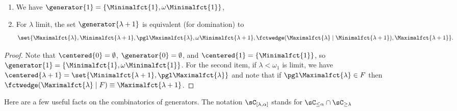 \begin{fact}\label{AlreadyKnownGenerators}
\begin{enumerate}
\item We have $\generator{1}=\{\Minimalfct{1}, \omega \Minimalfct{1}\}$,
\item For $\lambda$ limit, the set $\generator{\lambda+1}$ is equivalent (for domination) to 
\[\set{\Maximalfct{\lambda},\Minimalfct{\lambda+1},\pgl\Maximalfct{\lambda},\omega\Minimalfct{\lambda+1},
\fctwedge(\Maximalfct{\lambda}\mid\Minimalfct{\lambda+1}),\Maximalfct{\lambda+1}}.\]
\end{enumerate}
\end{fact}
\begin{proof}
Note that $\centered{0}=\emptyset$, $\generator{0}=\emptyset$, and $\centered{1}=\{\Minimalfct{1}\}$, so $\generator{1}=\{\Minimalfct{1},\omega \Minimalfct{1}\}$.
For the second item, if $\lambda<\omega_1$ is limit, we have $\centered{\lambda+1}=\set{\Minimalfct{\lambda+1},\pgl\Maximalfct{\lambda}}$ and note that if $\pgl \Maximalfct{\lambda}\in F$ then $\fctwedge(\Maximalfct{\lambda}\mid F)\equiv\Maximalfct{\lambda+1}$.
\end{proof}


Here are a few useful facts on the combinatorics of generators.
The notation $\sC_{[\lambda,\alpha]}$ stands for $\sC_{\leq \alpha}\cap\sC_{\geq\lambda}$

